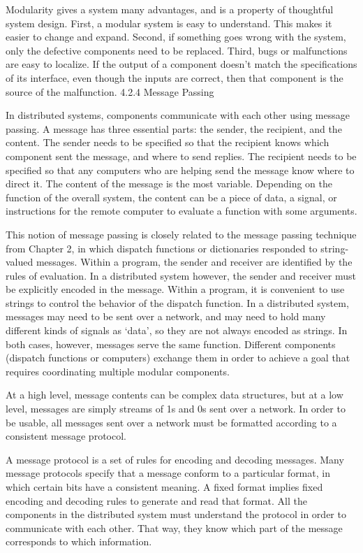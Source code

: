 \documentclass[letterpaper,10pt,dvipdfmx]{sphinxmanual}
\begin{document}
Modularity gives a system many advantages, and is a property of thoughtful system design. First, a modular system is easy to understand. This makes it easier to change and expand. Second, if something goes wrong with the system, only the defective components need to be replaced. Third, bugs or malfunctions are easy to localize. If the output of a component doesn't match the specifications of its interface, even though the inputs are correct, then that component is the source of the malfunction.
4.2.4   Message Passing

In distributed systems, components communicate with each other using message passing. A message has three essential parts: the sender, the recipient, and the content. The sender needs to be specified so that the recipient knows which component sent the message, and where to send replies. The recipient needs to be specified so that any computers who are helping send the message know where to direct it. The content of the message is the most variable. Depending on the function of the overall system, the content can be a piece of data, a signal, or instructions for the remote computer to evaluate a function with some arguments.

This notion of message passing is closely related to the message passing technique from Chapter 2, in which dispatch functions or dictionaries responded to string-valued messages. Within a program, the sender and receiver are identified by the rules of evaluation. In a distributed system however, the sender and receiver must be explicitly encoded in the message. Within a program, it is convenient to use strings to control the behavior of the dispatch function. In a distributed system, messages may need to be sent over a network, and may need to hold many different kinds of signals as `data', so they are not always encoded as strings. In both cases, however, messages serve the same function. Different components (dispatch functions or computers) exchange them in order to achieve a goal that requires coordinating multiple modular components.

At a high level, message contents can be complex data structures, but at a low level, messages are simply streams of 1s and 0s sent over a network. In order to be usable, all messages sent over a network must be formatted according to a consistent message protocol.

A message protocol is a set of rules for encoding and decoding messages. Many message protocols specify that a message conform to a particular format, in which certain bits have a consistent meaning. A fixed format implies fixed encoding and decoding rules to generate and read that format. All the components in the distributed system must understand the protocol in order to communicate with each other. That way, they know which part of the message corresponds to which information.
\end{document}
